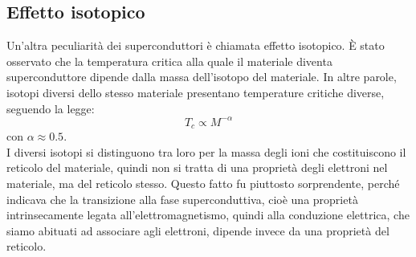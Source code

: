 \subsection{Effetto isotopico}
Un'altra peculiarità dei superconduttori è chiamata effetto isotopico. È stato osservato che la temperatura critica alla quale il materiale diventa superconduttore dipende dalla massa dell'isotopo del materiale. In altre parole, isotopi diversi dello stesso materiale presentano temperature critiche diverse, seguendo la legge:
\begin{equation*}
   T_c \propto M^{-\alpha}
\end{equation*}
con $\alpha \approx 0.5$.\\
I diversi isotopi si distinguono tra loro per la massa degli ioni che costituiscono il reticolo del materiale, quindi non si tratta di una proprietà degli elettroni nel materiale, ma del reticolo stesso. Questo fatto fu piuttosto sorprendente, perché indicava che la transizione alla fase superconduttiva, cioè una proprietà intrinsecamente legata all'elettromagnetismo, quindi alla conduzione elettrica, che siamo abituati ad associare agli elettroni, dipende invece da una proprietà del reticolo.\\
